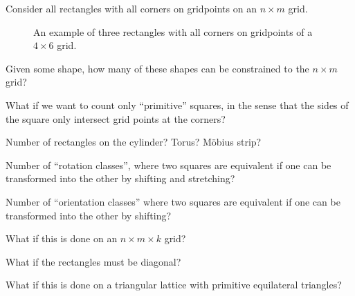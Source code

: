 \documentclass{article}
\begin{document}
Consider all rectangles with all corners on gridpoints on an $n \times m$ grid.
\begin{figure}[!h]
  \centering
  \caption{
    An example of three rectangles with all corners on gridpoints of a
    $4 \times 6$ grid.
  }
\end{figure}

\begin{question}
  Given some shape, how many of these shapes can be constrained to the
  $n \times m$ grid?
\end{question}
\begin{related}
  \item What if we want to count only ``primitive'' squares, in the sense that
    the sides of the square only intersect grid points at the corners?
  \item Number of rectangles on the cylinder? Torus? M\"obius strip?
  \item Number of ``rotation classes'', where two squares are equivalent if
    one can be transformed into the other by shifting and stretching?
  \item Number of ``orientation classes'' where two squares are equivalent if
    one can be transformed into the other by shifting?
  \item What if this is done on an $n \times m \times k$ grid?
  \item What if the rectangles must be diagonal?
  \item What if this is done on a triangular lattice with primitive equilateral
  triangles?
\end{related}
\end{document}

